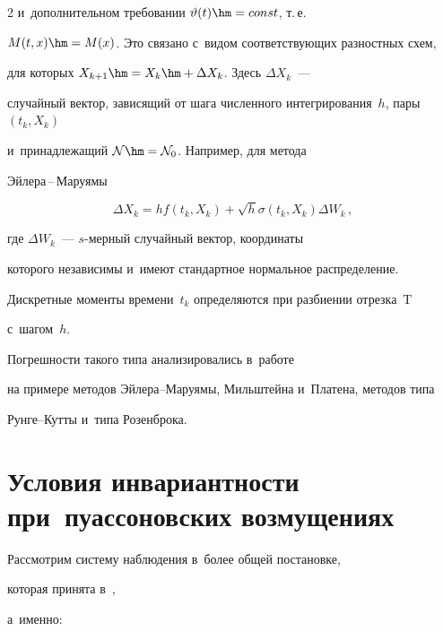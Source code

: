 \begin{multicols}{2}
и~дополнительном требовании $\vartheta(t) \hm= {const}$, т.\,е.\

 $M(t,x) \hm= M(x)$. Это связано с~видом соответствующих разностных схем, 

 для которых $X_{k+1} \hm= X_k \hm+ \Delta X_k$. Здесь $\Delta X_k$~--- 

 случайный вектор, зависящий от шага численного интегрирования~$h$, пары $(t_k,X_k)$ 

 и~принадлежащий $\mathcal{N} \hm= \mathcal{N}_0$. Например, для метода 

 Эй\-ле\-ра\,--\,Ма\-ру\-ямы

 {

 

 }

 

 \noindent

$$

  \Delta X_k = h  f(t_k,X_k) + \sqrt{h}  \sigma(t_k,X_k)  \Delta W_k\,,

$$

где $\Delta W_k$~--- $s$-мер\-ный случайный вектор, координаты 

которого независимы и~имеют стандартное нормальное распределение. 

Дискретные моменты времени~$t_k$ определяются при разбиении отрезка~$\mathrm{T}$ 

с~шагом~$h$. 



Погрешности такого типа анализировались в~работе~\cite{AveKarRyb_RJNAMM18} 

на примере методов Эй\-ле\-ра--Ма\-ру\-ямы, Мильштейна и~Платена, методов типа 

Рун\-ге--Кут\-ты и~типа Розенброка.







\section{Условия инвариантности при~пуассоновских возмущениях}



Рассмотрим систему наблюдения в~более общей постановке, 

которая принята в~\cite{Sin_SSI16, Sin_IP16, SinSinKor_SSI16, SinSinKor_IP17, SinSinSerKor_AiT18}, 

а~именно:

\begin{multline}


\end{multline}
\end{multicols}
